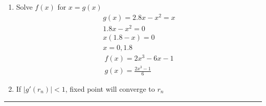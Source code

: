 \documentclass[10pt]{article}
\begin{document}
\begin{multicols}{2}
\begin{minipage}{\columnwidth}
\begin{flushright}
\begin{enumerate}
                \item Solve \(f(x)\) for \(x = g(x)\) \\
                    \begin{align*}
                        g(x) = 2.8x - x^2 = x \\
                        1.8x -x^2 = 0 \\
                        x(1.8 - x) = 0 \\
                        x = 0, 1.8
                    \end{align*}
                    \begin{align*}
                        f(x) = 2x^3 - 6x - 1 \\
                        g(x) = \frac{2x^3-1}{6}
                    \end{align*}
                \item If \(|g'(r_n)| < 1\), fixed point will converge to \(r_n\)
            \end{enumerate}
        \end{flushright}
    \end{minipage}
\end{multicols}

\begin{center}
    \rule{4in}{1pt}
\end{center}

\vspace{-1.5em}
\end{document}
